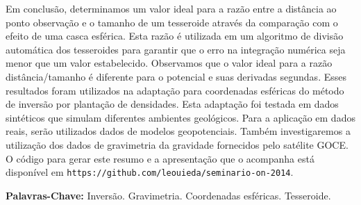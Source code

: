 \documentclass[12pt]{letter}
\begin{document}
Em conclusão,
determinamos um valor ideal
para a razão entre a distância ao ponto observação
e o tamanho de um tesseroide
através da comparação
com o efeito de uma casca esférica.
Esta razão é utilizada
em um algoritmo de divisão automática dos tesseroides
para garantir que o erro na integração numérica
seja menor que um valor estabelecido.
Observamos que o valor ideal
para a razão distância/tamanho
é diferente para o potencial
e suas derivadas segundas.
Esses resultados foram utilizados
na adaptação para coordenadas esféricas
do método de inversão por plantação de densidades.
Esta adaptação foi testada
em dados sintéticos
que simulam diferentes ambientes geológicos.
Para a aplicação em dados reais,
serão utilizados dados de modelos geopotenciais.
Também investigaremos
a utilização dos dados de gravimetria da gravidade
fornecidos pelo satélite GOCE.
O código para gerar este resumo
e a apresentação que o acompanha
está disponível em \texttt{https://github.com/leouieda/seminario-on-2014}.


\begin{flushleft}
\vspace{10 mm}
\textbf{Palavras-Chave:}
Inversão. Gravimetria. Coordenadas esféricas. Tesseroide.
\end{flushleft}
\end{document}
